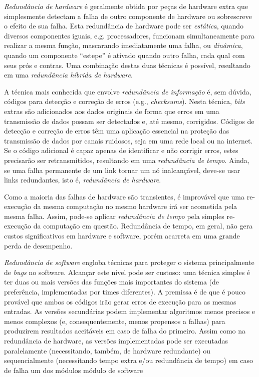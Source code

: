 \emph{Redundância de hardware} é geralmente obtida por peças de hardware extra que simplesmente detectam a falha de outro componente de hardware ou sobrescreve o efeito de sua falha. Esta redundância de hardware pode ser \emph{estática}, quando diversos componentes iguais, e.g. processadores, funcionam simultaneamente para realizar a mesma função, mascarando imediatamente uma falha, ou \emph{dinâmica}, quando um componente ``estepe'' é ativado quando outro falha, cada qual com seus prós e contras. Uma combinação destas duas técnicas é possível, resultando em uma \emph{redundância híbrida de hardware}.

A técnica mais conhecida que envolve \emph{redundância de informação} é, sem dúvida, códigos para detecção e correção de erros (e.g., \emph{checksums}). Nesta técnica, \emph{bits} extras são adicionados aos dados originais de forma que erros em uma transmissão de dados possam ser detectados e, até mesmo, corrigidos. Códigos de detecção e correção de erros têm uma aplicação essencial na proteção das transmissão de dados por canais ruidosos, seja em uma rede local ou na internet. Se o código adicional é capaz apenas de identificar e não corrigir erros, estes precisarão ser retransmitidos, resultando em uma \emph{redundância de tempo}. Ainda, se uma falha permanente de um link tornar um nó inalcançável, deve-se usar links redundantes, isto é, \emph{redundância de hardware}.

Como a maioria das falhas de hardware são transientes, é improvável que uma re-execução da mesma computação no mesmo hardware irá ser acometida pela mesma falha. Assim, pode-se aplicar \emph{redundância de tempo} pela simples re-execução da computação em questão. Redundância de tempo, em geral, não gera custos significativos em hardware e software, porém acarreta em uma grande perda de desempenho.

\emph{Redundância de software} engloba técnicas para proteger o sistema principalmente de \emph{bugs} no software. Alcançar este nível pode ser custoso: uma técnica simples é ter duas ou mais versões das funções mais importantes do sistema (de preferência, implementadas por times diferentes). A premissa é de que é pouco provável que ambos os códigos irão gerar erros de execução para as mesmas entradas. As versões secundárias podem implementar algoritmos menos precisos e menos complexos (e, consequentemente, menos propensos a falhas) para produzirem resultados aceitáveis em caso de falha do primeiro. Assim como na redundância de hardware, as versões implementadas pode ser executadas paralelamente (necessitando, também, de hardware redundante) ou sequencialmente (necessitando tempo extra e/ou redundância de tempo) em caso de falha um dos módulos módulo de software


